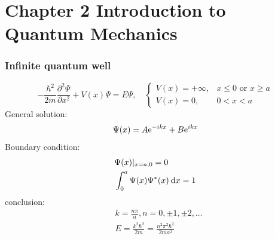 \documentclass{beamer}
\begin{document}
\section{Chapter 2 Introduction to Quantum Mechanics}
    \begin{frame} \frametitle{Infinite quantum well}
        \begin{equation*}
            - \frac{\hbar^2}{2m} \frac{\partial^2 \Psi}{\partial x^2} + V(x) \Psi = E \Psi  , \quad \left\{
                \begin{array}{ll}
                    V(x) = + \infty, & x \le 0 \text{ or } x \ge a \\
                    V(x) = 0, & 0 < x < a
                \end{array}
            \right.
        \end{equation*}
        General solution:
        \begin{equation*}
            \Psi (x) = A \mathrm{e}^{-ikx} + B \mathrm{e}^{ikx} 
        \end{equation*}
        Boundary condition:
        \begin{equation*}
            \begin{aligned}
                    & \Psi (x) | _{x = a, 0} = 0 \\
                    & \int_{0}^{a} \Psi(x) \Psi^*(x) \: \mathrm{d} x = 1 \\
            \end{aligned}
        \end{equation*}
        conclusion:
        \begin{equation*}
            \begin{aligned}
                &k = \frac{n\pi}{a} , n = 0, \pm 1, \pm 2, \dots \\
                &E = \frac{k^2 \hbar^2}{2m} = \frac{n^2 \pi^2 \hbar^2}{2m a^2}  
            \end{aligned}
        \end{equation*}
    \end{frame}
\end{document}
